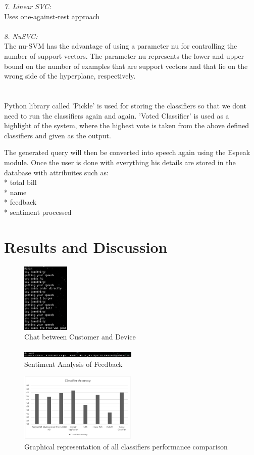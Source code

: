 \documentclass[conference]{IEEEtran}
\begin{document}
{	\textit{7. Linear SVC: }\\
	Uses one-against-rest approach\\\\
	\textit{8. NuSVC:} \\
	The nu-SVM has the advantage of using a parameter nu for controlling the number of support vectors. The parameter nu represents the lower and upper bound on the number of examples that are support vectors and that lie on the wrong side of the hyperplane, respectively. 
\\\\\\
Python library called 'Pickle' is used for storing the classifiers so that we dont need to run the classifiers again and again. 'Voted Classifier' is used as a highlight of the system, where the highest vote is taken from the above defined classifiers and given as the output.

\bigskip

The generated query will then be converted into speech again using the Espeak module. Once the user is done with everything his details are stored in the database with attribuites such as:\\
* total bill\\
* name\\
* feedback\\
* sentiment processed\\

\section{Results and Discussion}
\begin{figure}[!ht]
	\centering
	\includegraphics[width=0.2\textwidth]{input.png}
	\caption{Chat between Customer and Device}
\end{figure}
\begin{figure}[!ht]
	\centering
	\includegraphics[width=0.5\textwidth]{output.png}
	\caption{Sentiment Analysis of Feedback}
\end{figure}
\begin{figure}[!ht]
	\centering
	\includegraphics[width=0.5\textwidth]{R2.png}
	\caption{Graphical representation of all classifiers performance comparison}
\end{figure}

}
\end{document}

